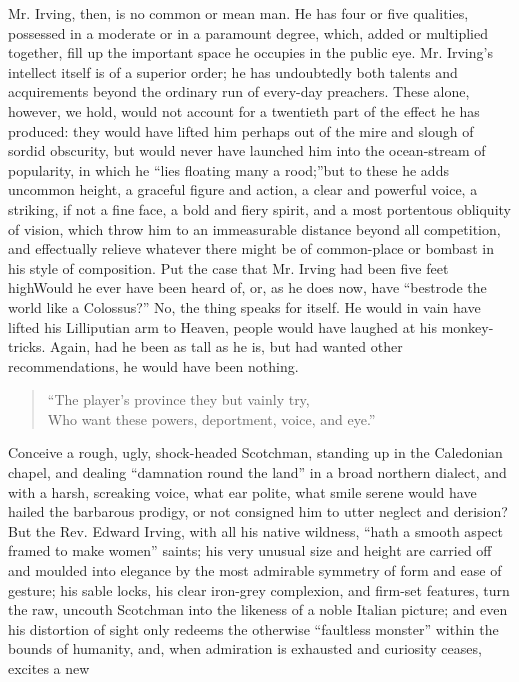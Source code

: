 Mr. Irving, then, is no common or mean man. He has four or five
qualities, possessed in a moderate or in a paramount degree,
which, added or multiplied together, fill up the important space
he occupies in the public eye. Mr. Irving's intellect itself is of
a superior order; he has undoubtedly both talents and acquirements
beyond the ordinary run of every-day preachers. These alone,
however, we hold, would not account for a twentieth part of the
effect he has produced: they would have lifted him perhaps out of
the mire and slough of sordid obscurity, but would never have
launched him into the ocean-stream of popularity, in which he
``lies floating many a rood;''\textemdash but to these he adds
uncommon height, a graceful figure and action, a clear and
powerful voice, a striking, if not a fine face, a bold and fiery
spirit, and a most portentous obliquity of vision, which throw him
to an immeasurable distance beyond all competition, and
effectually relieve whatever there might be of common-place or
bombast in his style of composition. Put the case that Mr. Irving
had been five feet high\textemdash Would he ever have been heard
of, or, as he does now, have ``bestrode the world like a Colossus?''
No, the thing speaks for itself. He would in vain have lifted his
Lilliputian arm to Heaven, people would have laughed at his
monkey-tricks. Again, had he been as tall as he is, but had wanted
other recommendations, he would have been nothing.
\begin{quote}
  ``The player's province they but vainly try, \\
  Who want these powers, deportment, voice, and eye.''
\end{quote}
Conceive a rough, ugly, shock-headed Scotchman, standing up in the
Caledonian chapel, and dealing ``damnation round the land'' in a
broad northern dialect, and with a harsh, screaking voice, what
ear polite, what smile serene would have hailed the barbarous
prodigy, or not consigned him to utter neglect and derision? But
the Rev. Edward Irving, with all his native wildness, ``hath a
smooth aspect framed to make women'' saints; his very unusual size
and height are carried off and moulded into elegance by the most
admirable symmetry of form and ease of gesture; his sable locks,
his clear iron-grey complexion, and firm-set features, turn the
raw, uncouth Scotchman into the likeness of a noble Italian
picture; and even his distortion of sight only redeems the
otherwise ``faultless monster'' within the bounds of humanity, and,
when admiration is exhausted and curiosity ceases, excites a new
